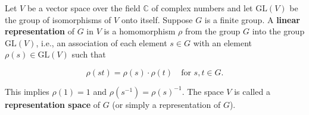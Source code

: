 Let $V$ be a vector space over the field $\mathbb{C}$ of complex numbers and let $\text{GL}(V)$ be the group of isomorphisms of $V$ onto itself. Suppose $G$ is a finite group. A \textbf{linear representation} of $G$ in $V$ is a homomorphism $\rho$ from the group $G$ into the group $\text{GL}(V)$, i.e., an association of each element $s \in G$ with an element $\rho(s) \in \text{GL}(V)$ such that

$$\rho(st) = \rho(s) \cdot \rho(t) \quad \text{for } s, t \in G.$$

This implies $\rho(1) = 1$ and $\rho(s^{-1}) = \rho(s)^{-1}$. The space $V$ is called a \textbf{representation space} of $G$ (or simply a representation of $G$).

